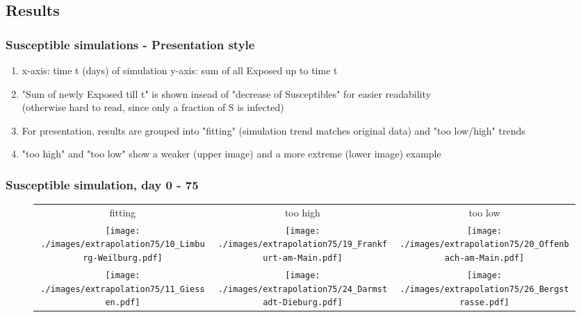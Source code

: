 \documentclass{beamer}
\begin{document}
\subsection{Results}
\begin{frame}
	\frametitle{Susceptible simulations - Presentation style}
	\begin{enumerate}[$\bullet$]
		\item x-axis: time t (days) of simulation \newline
			y-axis: sum of all Exposed up to time t
		\item "Sum of newly Exposed till t" is shown insead of "decrease of Susceptibles" for easier readability\\
			(otherwise hard to read, since only a fraction of S is infected)
		\item For presentation, results are grouped into "fitting" (simulation trend matches original data) and "too low/high" trends
		\item "too high" and "too low" show a weaker (upper image) and a more extreme (lower image) example
	\end{enumerate}
\end{frame}

\begin{frame}
	\frametitle{Susceptible simulation, day 0 - 75}
	\begin{center}
		\begin{figure}
			\begin{adjustwidth}{-0.8cm}{}
			\begin{tabular}{c|c|c}
				fitting & too high & too low \\
				\texttt{[image: ./images/extrapolation75/10\_Limburg-Weilburg.pdf]}
					& \texttt{[image: ./images/extrapolation75/19\_Frankfurt-am-Main.pdf]}
					& \texttt{[image: ./images/extrapolation75/20\_Offenbach-am-Main.pdf]} \\
				\texttt{[image: ./images/extrapolation75/11\_Giessen.pdf]}
					& \texttt{[image: ./images/extrapolation75/24\_Darmstadt-Dieburg.pdf]}
					& \texttt{[image: ./images/extrapolation75/26\_Bergstrasse.pdf]}
			\end{tabular}
			\end{adjustwidth}
		\end{figure}
	\end{center}
\end{frame}
\end{document}
